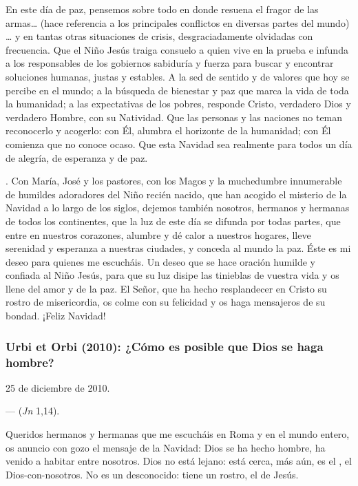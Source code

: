 \begin{body}
\begin{body}
En este día de paz, pensemos sobre todo en donde resuena el fragor de las armas\ldots{} (hace referencia a los principales conflictos en diversas partes del mundo) \ldots{} y en tantas otras situaciones de crisis, desgraciadamente olvidadas con frecuencia. Que el Niño Jesús traiga consuelo a quien vive en la prueba e infunda a los responsables de los gobiernos sabiduría y fuerza para buscar y encontrar soluciones humanas, justas y estables. A la sed de sentido y de valores que hoy se percibe en el mundo; a la búsqueda de bienestar y paz que marca la vida de toda la humanidad; a las expectativas de los pobres, responde Cristo, verdadero Dios y verdadero Hombre, con su Natividad. Que las personas y las naciones no teman reconocerlo y acogerlo: con Él,  alumbra el horizonte de la humanidad; con Él comienza  que no conoce ocaso. Que esta Navidad sea realmente para todos un día de alegría, de esperanza y de paz.

\emph{}. Con María, José y los pastores, con los Magos y la muchedumbre innumerable de humildes adoradores del Niño recién nacido, que han acogido el misterio de la Navidad a lo largo de los siglos, dejemos también nosotros, hermanos y hermanas de todos los continentes, que la luz de este día se difunda por todas partes, que entre en nuestros corazones, alumbre y dé calor a nuestros hogares, lleve serenidad y esperanza a nuestras ciudades, y conceda al mundo la paz. Éste es mi deseo para quienes me escucháis. Un deseo que se hace oración humilde y confiada al Niño Jesús, para que su luz disipe las tinieblas de vuestra vida y os llene del amor y de la paz. El Señor, que ha hecho resplandecer en Cristo su rostro de misericordia, os colme con su felicidad y os haga mensajeros de su bondad. ¡Feliz Navidad!

\subsubsection{Urbi et Orbi (2010): ¿Cómo es posible que Dios se haga hombre?}

25 de diciembre de 2010.

 ---  (\emph{Jn} 1,14).

Queridos hermanos y hermanas que me escucháis en Roma y en el mundo entero, os anuncio con gozo el mensaje de la Navidad: Dios se ha hecho hombre, ha venido a habitar entre nosotros. Dios no está lejano: está cerca, más aún, es el , el Dios-con-nosotros. No es un desconocido: tiene un rostro, el de Jesús.


\end{body}
\end{body}
